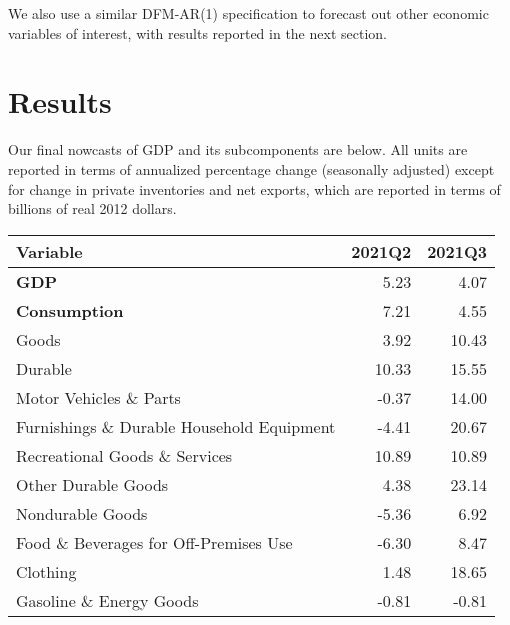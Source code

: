 \documentclass[11pt, letterpaper]{article}\usepackage[]{graphicx}\usepackage[]{color}
\begin{document}
We also use a similar DFM-AR(1) specification to forecast out other economic variables of interest, with results reported in the next section.


\section{Results}
Our final nowcasts of GDP and its subcomponents are below. All units are reported in terms of annualized percentage change (seasonally adjusted) except for change in private inventories and net exports, which are reported in terms of billions of real 2012 dollars.
\begin{table}[H]
\centering
\begingroup\fontsize{10pt}{12pt}\selectfont
\begin{tabular}{lrr}
  \hline
Variable & 2021Q2 & 2021Q3 \\ 
  \hline
\hspace{0mm} \textbf{GDP} & 5.23 & 4.07 \\ 
  \hspace{0mm} \textbf{Consumption} & 7.21 & 4.55 \\ 
  \hspace{8mm}  Goods & 3.92 & 10.43 \\ 
  \hspace{16mm}  Durable & 10.33 & 15.55 \\ 
  \hspace{24mm}  Motor Vehicles \& Parts & -0.37 & 14.00 \\ 
  \hspace{24mm}  Furnishings \& Durable Household Equipment & -4.41 & 20.67 \\ 
  \hspace{24mm}  Recreational Goods \& Services & 10.89 & 10.89 \\ 
  \hspace{24mm}  Other Durable Goods & 4.38 & 23.14 \\ 
  \hspace{16mm}  Nondurable Goods & -5.36 & 6.92 \\ 
  \hspace{24mm}  Food \& Beverages for Off-Premises Use & -6.30 & 8.47 \\ 
  \hspace{24mm}  Clothing & 1.48 & 18.65 \\ 
  \hspace{24mm}  Gasoline \& Energy Goods & -0.81 & -0.81 \\ 

\end{tabular}
\end{table}
\end{document}
